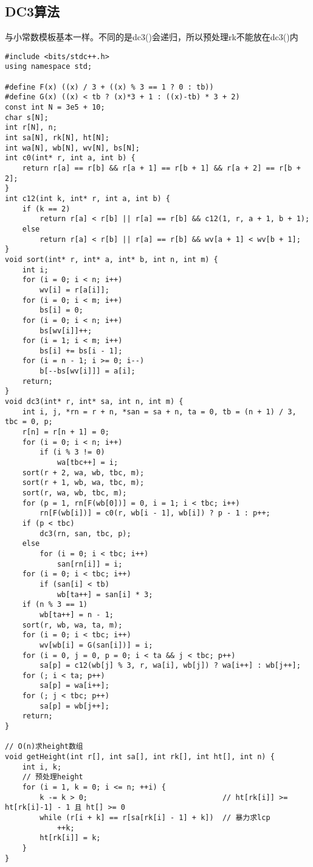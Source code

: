     \subsection{DC3算法}
        与小常数模板基本一样。不同的是dc3()会递归，所以预处理rk不能放在dc3()内
\begin{lstlisting}
#include <bits/stdc++.h>
using namespace std;

#define F(x) ((x) / 3 + ((x) % 3 == 1 ? 0 : tb))
#define G(x) ((x) < tb ? (x)*3 + 1 : ((x)-tb) * 3 + 2)
const int N = 3e5 + 10;
char s[N];
int r[N], n;
int sa[N], rk[N], ht[N];
int wa[N], wb[N], wv[N], bs[N];
int c0(int* r, int a, int b) {
    return r[a] == r[b] && r[a + 1] == r[b + 1] && r[a + 2] == r[b + 2];
}
int c12(int k, int* r, int a, int b) {
    if (k == 2)
        return r[a] < r[b] || r[a] == r[b] && c12(1, r, a + 1, b + 1);
    else
        return r[a] < r[b] || r[a] == r[b] && wv[a + 1] < wv[b + 1];
}
void sort(int* r, int* a, int* b, int n, int m) {
    int i;
    for (i = 0; i < n; i++)
        wv[i] = r[a[i]];
    for (i = 0; i < m; i++)
        bs[i] = 0;
    for (i = 0; i < n; i++)
        bs[wv[i]]++;
    for (i = 1; i < m; i++)
        bs[i] += bs[i - 1];
    for (i = n - 1; i >= 0; i--)
        b[--bs[wv[i]]] = a[i];
    return;
}
void dc3(int* r, int* sa, int n, int m) {
    int i, j, *rn = r + n, *san = sa + n, ta = 0, tb = (n + 1) / 3, tbc = 0, p;
    r[n] = r[n + 1] = 0;
    for (i = 0; i < n; i++)
        if (i % 3 != 0)
            wa[tbc++] = i;
    sort(r + 2, wa, wb, tbc, m);
    sort(r + 1, wb, wa, tbc, m);
    sort(r, wa, wb, tbc, m);
    for (p = 1, rn[F(wb[0])] = 0, i = 1; i < tbc; i++)
        rn[F(wb[i])] = c0(r, wb[i - 1], wb[i]) ? p - 1 : p++;
    if (p < tbc)
        dc3(rn, san, tbc, p);
    else
        for (i = 0; i < tbc; i++)
            san[rn[i]] = i;
    for (i = 0; i < tbc; i++)
        if (san[i] < tb)
            wb[ta++] = san[i] * 3;
    if (n % 3 == 1)
        wb[ta++] = n - 1;
    sort(r, wb, wa, ta, m);
    for (i = 0; i < tbc; i++)
        wv[wb[i] = G(san[i])] = i;
    for (i = 0, j = 0, p = 0; i < ta && j < tbc; p++)
        sa[p] = c12(wb[j] % 3, r, wa[i], wb[j]) ? wa[i++] : wb[j++];
    for (; i < ta; p++)
        sa[p] = wa[i++];
    for (; j < tbc; p++)
        sa[p] = wb[j++];
    return;
}

// O(n)求height数组
void getHeight(int r[], int sa[], int rk[], int ht[], int n) {
    int i, k;
    // 预处理height
    for (i = 1, k = 0; i <= n; ++i) {
        k -= k > 0;                               // ht[rk[i]] >= ht[rk[i]-1] - 1 且 ht[] >= 0
        while (r[i + k] == r[sa[rk[i] - 1] + k])  // 暴力求lcp
            ++k;
        ht[rk[i]] = k;
    }
}


\end{lstlisting}
